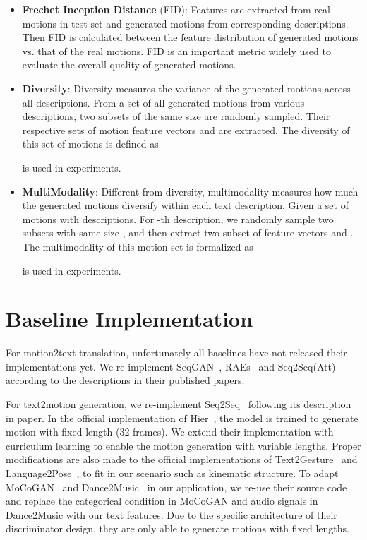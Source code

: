 \documentclass[runningheads]{llncs}
\newcommand{\beforesection}{\vspace{-2mm}}
\newcommand{\aftersection}{\vspace{-2mm}}
\begin{document}
\begin{itemize}
    \item \textbf{Frechet Inception Distance} (FID): Features are extracted from real motions in test set and generated motions from corresponding descriptions. Then FID is calculated between the feature distribution of generated motions vs. that of the real motions. FID is an important metric widely used to evaluate the overall quality of generated motions.
    \item \textbf{Diversity}: Diversity measures the variance of the generated motions across all descriptions. From a set of all generated motions from various descriptions, two subsets of the same size  are randomly sampled. Their respective sets of motion feature vectors  and  are extracted. The diversity of this set of motions is defined as
    
    
    
     is used in experiments.
    \item \textbf{MultiModality}: Different from diversity, multimodality measures how much the generated motions diversify within each text description. Given a set of motions with  descriptions. For -th description, we randomly sample two subsets with same size  , and then extract two subset of feature vectors  and . The multimodality of this motion set is formalized as
    
    
    
     is used in experiments.
    
\end{itemize}

\beforesection
\section{Baseline Implementation}
\aftersection
For motion2text translation, unfortunately all baselines have not released their implementations yet. We re-implement SeqGAN~\cite{goutsu2021linguistic}, RAEs~\cite{yamada2018paired} and Seq2Seq(Att)~\cite{plappert2018learning} according to the descriptions in their published papers.

For text2motion generation, we re-implement Seq2Seq~\cite{lin2018generating} following its description in paper. In the official implementation of Hier~\cite{ghosh2021synthesis}, the model is trained to generate motion with fixed length (32 frames). We extend their implementation with curriculum learning to enable the motion generation with variable lengths. Proper modifications are also made to the official implementations of Text2Gesture~\cite{bhattacharya2021text2gestures} and Language2Pose~\cite{ahuja2019language2pose}, to fit in our scenario such as kinematic structure. To adapt MoCoGAN~\cite{tulyakov2018mocogan} and Dance2Music~\cite{huang2020dance} in our application, we re-use their source code and replace the categorical condition in MoCoGAN and audio signals in Dance2Music with our text features. Due to the specific architecture of their discriminator design, they are only able to generate motions with fixed lengths.
\beforesection
\end{document}

